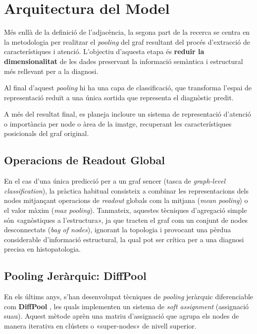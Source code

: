 ﻿\documentclass[10pt,a4paper,twocolumn,twoside]{article}
\begin{document}
\section{Arquitectura del Model}

Més enllà de la definició de l'adjacència, la segona part de la recerca se centra en la metodologia per realitzar el \textit{pooling} del graf resultant del procés d'extracció de característiques i atenció. L'objectiu d'aquesta etapa és \textbf{reduir la dimensionalitat} de les dades preservant la informació semàntica i estructural més rellevant per a la diagnosi.

Al final d'aquest \textit{pooling} hi ha una capa de classificació, que transforma l'espai de representació reduït a una única sortida que representa el diagnòstic predit.

A més del resultat final, es planeja incloure un sistema de representació d'atenció o importància per node o àrea de la imatge, recuperant les característiques posicionals del graf original.

\subsection{Operacions de Readout Global}

En el cas d'una única predicció per a un graf sencer (tasca de \textit{graph-level classification}), la pràctica habitual consisteix a combinar les representacions dels nodes mitjançant operacions de \textit{readout} globals com la mitjana (\textit{mean pooling}) o el valor màxim (\textit{max pooling}). Tanmateix, aquestes tècniques d'agregació simple són «agnòstiques a l'estructura», ja que tracten el graf com un conjunt de nodes desconnectats (\textit{bag of nodes}), ignorant la topologia i provocant una pèrdua considerable d'informació estructural, la qual pot ser crítica per a una diagnosi precisa en histopatologia.

\subsection{Pooling Jeràrquic: DiffPool}

En els últims anys, s'han desenvolupat tècniques de \textit{pooling} jeràrquic diferenciable com \textbf{DiffPool} \cite{ying2019hierarchicalgraphrepresentationlearning}, les quals implementen un sistema de \textit{soft assignment} (assignació suau). Aquest mètode aprèn una matriu d'assignació que agrupa els nodes de manera iterativa en clústers o «super-nodes» de nivell superior.
\end{document}
